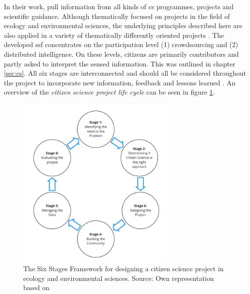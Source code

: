 In their work, \textcite{fraislCitizenScienceEnvironmental2022} pull information from all kinds of \acrshort{cs} programmes, projects and scientific guidance. Although thematically focused on projects in the field of ecology and environmental sciences, the underlying principles described here are also applied in a variety of thematically differently oriented projects \autocite{fraislCitizenScienceEnvironmental2022}. The developed \acrfull{ssf} concentrates on the participation level (1) crowdsourcing and (2) distributed intelligence. On these levels, citizens are primarily contributors and partly asked to interpret the sensed information. This was outlined in chapter \ref{sec:cs}. All six stages are interconnected and should all be considered throughout the project to incorporate new information, feedback and lessons learned \autocite{fraislCitizenScienceEnvironmental2022}. An overview of the \textit{citizen science project life cycle} can be seen in figure \ref{fig:meth_ssf}.

\begin{figure}[!htp]
    \centering
    \includegraphics[width=0.7\textwidth]{figures/2023_MA_methods_ssf_original.pdf}
    \decoRule
    \caption[The Six Stages Framework]{The Six Stages Framework for designing a citizen science project in ecology and environmental sciences. Source: Own representation based on \textcite[4]{fraislCitizenScienceEnvironmental2022}}
    \label{fig:meth_ssf}
\end{figure}

